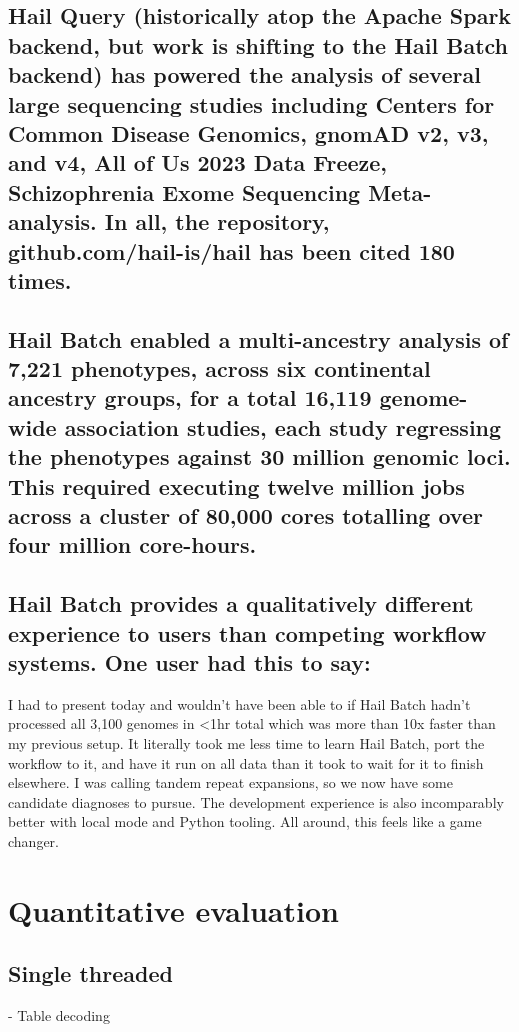\documentclass[sigconf, nonacm]{acmart}
\begin{document}
\subsection{Hail Query (historically atop the Apache Spark backend, but work is shifting to the Hail Batch backend) has powered the analysis of several large sequencing studies including Centers for Common Disease Genomics, gnomAD v2, v3, and v4, All of Us 2023 Data Freeze, Schizophrenia Exome Sequencing Meta-analysis. In all, the repository, github.com/hail-is/hail has been cited 180 times.}

\subsection{Hail Batch enabled a multi-ancestry analysis of 7,221 phenotypes, across six continental ancestry groups, for a total 16,119 genome-wide association studies, each study regressing the phenotypes against 30 million genomic loci. This required executing twelve million jobs across a cluster of 80,000 cores totalling over four million core-hours.}

\subsection{Hail Batch provides a qualitatively different experience to users than competing workflow systems. One user had this to say:}

    I had to present today and wouldn't have been able to if Hail Batch hadn't processed all 3,100 genomes in <1hr total which was more than 10x faster than my previous setup. It literally took me less time to learn Hail Batch, port the workflow to it, and have it run on all data than it took to wait for it to finish elsewhere. I was calling tandem repeat expansions, so we now have some candidate diagnoses to pursue.
    The development experience is also incomparably better with local mode and Python tooling.
    All around, this feels like a game changer.

\section{Quantitative evaluation}

\subsection{Single threaded}

    - Table decoding
\end{document}
